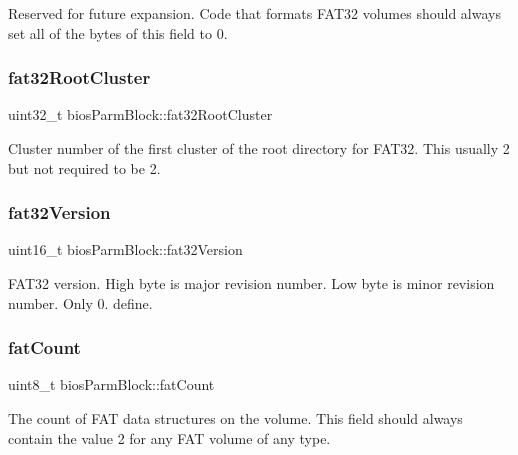 Reserved for future expansion. Code that formats F\+A\+T32 volumes should always set all of the bytes of this field to 0. \mbox{\label{structbios_parm_block_a77ca01bd99f746e05dd872cbd2979937}} 
\subsubsection{\texorpdfstring{fat32\+Root\+Cluster}{fat32RootCluster}}
{\footnotesize\ttfamily uint32\+\_\+t bios\+Parm\+Block\+::fat32\+Root\+Cluster}

Cluster number of the first cluster of the root directory for F\+A\+T32. This usually 2 but not required to be 2. \mbox{\label{structbios_parm_block_abad4f6f0c14dad9f5b7d43de94e685e8}} 
\subsubsection{\texorpdfstring{fat32\+Version}{fat32Version}}
{\footnotesize\ttfamily uint16\+\_\+t bios\+Parm\+Block\+::fat32\+Version}

F\+A\+T32 version. High byte is major revision number. Low byte is minor revision number. Only 0. define. \mbox{\label{structbios_parm_block_a7c03f147c3fb18f0df03d346050af13b}} 
\subsubsection{\texorpdfstring{fat\+Count}{fatCount}}
{\footnotesize\ttfamily uint8\+\_\+t bios\+Parm\+Block\+::fat\+Count}

The count of F\+AT data structures on the volume. This field should always contain the value 2 for any F\+AT volume of any type. \mbox{\label{structbios_parm_block_a2324ca82e2a7da4d91f458fa32a6e239}} 
